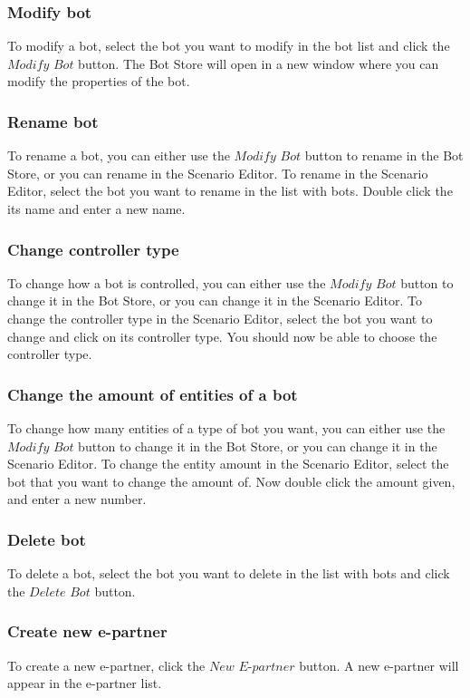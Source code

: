 \documentclass[11pt,a4paper]{article}
\begin{document}
\subsubsection{Modify bot}
To modify a bot, select the bot you want to modify in the bot list and click the $Modify$ $Bot$ button. The Bot Store will open in a new window where you can modify the properties of the bot.

\subsubsection{Rename bot}
To rename a bot, you can either use the $Modify$ $Bot$ button to rename in the Bot Store, or you can rename in the Scenario Editor. To rename in the Scenario Editor, select the bot you want to rename in the list with bots. Double click the its name and enter a new name.

\subsubsection{Change controller type}
To change how a bot is controlled, you can either use the $Modify$ $Bot$ button to change it in the Bot Store, or you can change it in the Scenario Editor. To change the controller type in the Scenario Editor, select the bot you want to change and click on its controller type. You should now be able to choose the controller type.

\subsubsection{Change the amount of entities of a bot}
To change how many entities of a type of bot you want, you can either use the $Modify$ $Bot$ button to change it in the Bot Store, or you can change it in the Scenario Editor. To change the entity amount in the Scenario Editor, select the bot that you want to change the amount of. Now double click the amount given, and enter a new number.

\subsubsection{Delete bot}
To delete a bot, select the bot you want to delete in the list with bots and click the $Delete$ $Bot$ button.

\subsubsection{Create new e-partner}
To create a new e-partner, click the $New$ $E$-$partner$ button. A new e-partner will appear in the e-partner list.
\end{document}
